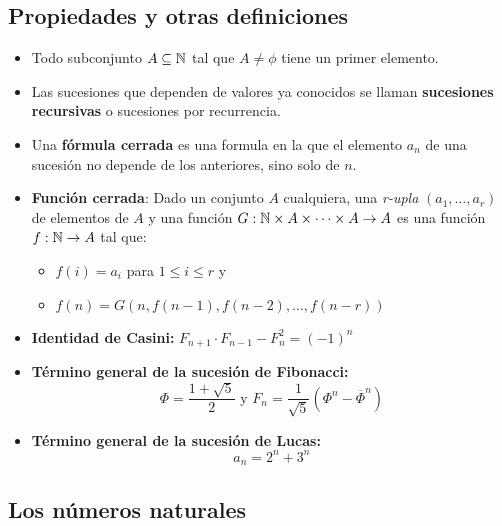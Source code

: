 \subsection{Propiedades y otras definiciones}
\begin{itemize}
    \item Todo subconjunto $A\subseteq\mathbb{N}$ tal que $A\neq\phi$ tiene un primer elemento.
    \item Las sucesiones que dependen de valores ya conocidos se llaman \textbf{sucesiones recursivas} o sucesiones por recurrencia.
    \item Una \textbf{fórmula cerrada} es una formula en la que el elemento $a_n$ de una sucesión no depende de los anteriores, sino solo de $n$.
    \item \textbf{Función cerrada}: Dado un conjunto $A$ cualquiera, una \textit{r-upla} $(a_1,\dots,a_r)$ de elementos de $A$ y una función $G : \mathbb{N}\times A\times\dots\times A\rightarrow A$ es una función $f : \mathbb{N}\rightarrow A$ tal que:
    \begin{itemize}
        \item $f(i) = a_i$ para $1\leq i\leq r$ y
        \item $f(n) = G(n, f(n-1), f(n-2),\dots,f(n-r))$
    \end{itemize}
    \item \textbf{Identidad de Casini:} $F_{n+1}\cdot F_{n-1} - F_n^2 = (-1)^n$
    \item \textbf{Término general de la sucesión de Fibonacci:}
    \begin{equation*}
        \Phi = \frac{1+\sqrt{5}}{2} \text{ y } F_n = \frac{1}{\sqrt{5}}\left(\Phi^n - \overline{\Phi}^n\right)
    \end{equation*}
        \item \textbf{Término general de la sucesión de Lucas:}
    \begin{equation*}
        a_n = 2^n + 3^n
    \end{equation*}
\end{itemize}

\subsection{Los números naturales}
